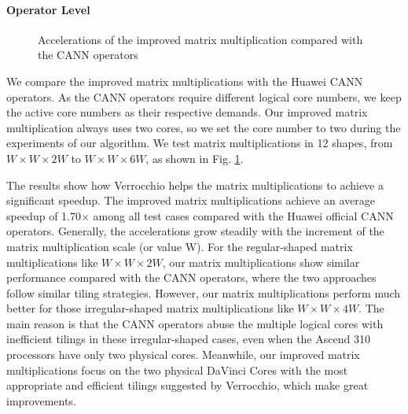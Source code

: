 \documentclass[12pt]{extbook}
\begin{document}
\paragraph{Operator Level}

\begin{figure}[tbp]
\caption{Accelerations of the improved matrix multiplication compared with the CANN operators}
\label{fig:eva}
\end{figure}

We compare the improved matrix multiplications with the Huawei CANN operators. As the CANN operators require different logical core numbers, we keep the active core numbers as their respective demands. Our improved matrix multiplication always uses two cores, so we set the core number to two during the experiments of our algorithm. We test matrix multiplications in 12 shapes, from $W \times W \times 2W$ to $W \times W \times 6W$, as shown in Fig. \ref{fig:eva}.

The results show how Verrocchio helps the matrix multiplications to achieve a significant speedup. The improved matrix multiplications achieve an average speedup of 1.70$\times$ among all test cases compared with the Huawei official CANN operators. Generally, the accelerations grow steadily with the increment of the matrix multiplication scale (or value W). For the regular-shaped matrix multiplications like $W \times W \times 2W$, our matrix multiplications show similar performance compared with the CANN operators, where the two approaches follow similar tiling strategies. However, our matrix multiplications perform much better for those irregular-shaped matrix multiplications like $W \times W \times 4W$. The main reason is that the CANN operators abuse the multiple logical cores with inefficient tilings in these irregular-shaped cases, even when the Ascend 310 processors have only two physical cores. Meanwhile, our improved matrix multiplications focus on the two physical DaVinci Cores with the most appropriate and efficient tilings suggested by Verrocchio, which make great improvements.
\end{document}
